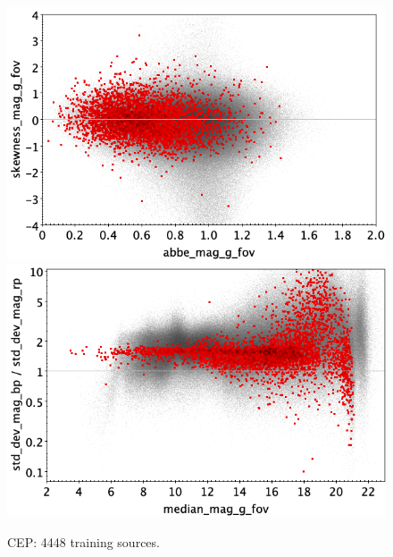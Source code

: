 \documentclass[longauth]{aa}
\begin{document}
\begin{appendix}
\begin{figure}
\vspace{4mm}
 \includegraphics[width=0.45\hsize]{figures/appendix/CEP_trn_ask.png}  %
\hspace{2mm}
 \includegraphics[width=0.45\hsize]{figures/appendix/CEP_trn_msdr.png}  \\ %
\vspace{4mm}
 \caption{CEP: 4448 training sources.}  
 \label{fig:app:CEP_trn}
\end{figure}


\end{appendix}
\end{document}
